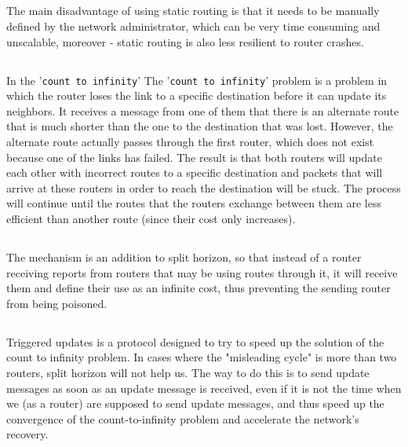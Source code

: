 \subsection{}
The main disadvantage of using static routing is that it needs to be manually defined
by the network administrator, which can be very time consuming and unscalable,
moreover - static routing is also less resilient to router crashes.

\subsection{}
In the '\texttt{count to infinity}' 
The '\texttt{count to infinity}' problem is a problem in which the router loses the link
to a specific destination before it can update its neighbors. It receives a message from
one of them that there is an alternate route that is much shorter than the one to the
destination that was lost. However, the alternate route actually passes through the first
router, which does not exist because one of the links has failed. The result is that both
routers will update each other with incorrect routes to a specific destination and packets
that will arrive at these routers in order to reach the destination will be stuck.
The process will continue until the routes that the routers exchange between them are less
efficient than another route (since their cost only increases).

\subsection{}
The mechanism is an addition to split horizon,
so that instead of a router receiving reports from routers that may be using routes
through it, it will receive them and define their use as an infinite cost, thus preventing
the sending router from being poisoned.

\subsection{}
Triggered updates is a protocol designed to try to speed up the solution of the count to
infinity problem. In cases where the "misleading cycle" is more than two routers,
split horizon will not help us. The way to do this is to send update messages as soon as an
update message is received, even if it is not the time when we (as a router) are supposed to
send update messages, and thus speed up the convergence of the count-to-infinity problem and
accelerate the network's recovery.

